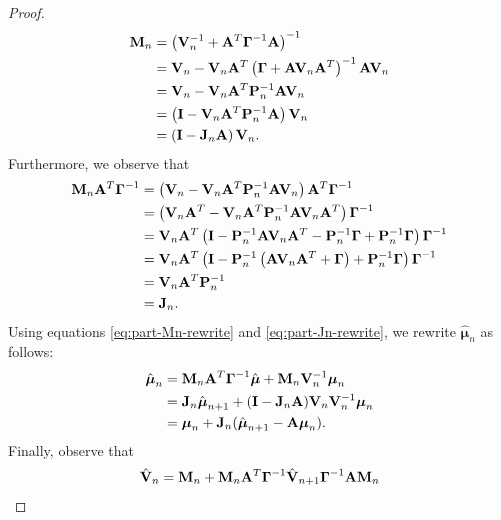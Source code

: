 \documentclass[11pt]{article}
\numberwithin{equation}{section}
\begin{document}
\begin{proof}
	\begin{align}
		{\bf M}_n 
			&= \left({\bf V}_n^{-1} + {\bf A}^T \boldsymbol\Gamma^{-1} {\bf A}\right)^{-1}\\
			&= {\bf V}_n - {\bf V}_n{\bf A}^T\left(\boldsymbol\Gamma + {\bf A}{\bf V}_n {\bf A}^T\right)^{-1}{\bf A}{\bf V}_n\\
			&= {\bf V}_n - {\bf V}_n{\bf A}^T{\bf P}_n^{-1}{\bf A}{\bf V}_n\\
			&= \left({\bf I} - {\bf V}_n{\bf A}^T{\bf P}_n^{-1}{\bf A}\right){\bf V}_n\\
			&= \left({\bf I} - {\bf J}_n{\bf A}\right){\bf V}_n. \label{eq:part-Mn-rewrite}
	\end{align}
	Furthermore, we observe that
	\begin{align}
		{\bf M}_n {\bf A}^T \boldsymbol{\Gamma}^{-1}
		&= \left({\bf V}_n - {\bf V}_n{\bf A}^T{\bf P}_n^{-1}{\bf A}{\bf V}_n\right){\bf A}^T\boldsymbol\Gamma^{-1}\\
		&= \left({\bf V}_n{\bf A}^T - {\bf V}_n{\bf A}^T{\bf P}_n^{-1}{\bf A}{\bf V}_n{\bf A}^T\right)\boldsymbol\Gamma^{-1}\\
		&= {\bf V}_n{\bf A}^T\left({\bf I} - {\bf P}_n^{-1}{\bf A}{\bf V}_n{\bf A}^T - {\bf P}_n^{-1}\boldsymbol{\Gamma} + {\bf P}_n^{-1}\boldsymbol{\Gamma}\right)\boldsymbol\Gamma^{-1}\\
		&= {\bf V}_n{\bf A}^T\left({\bf I} - {\bf P}_n^{-1}\left({\bf A}{\bf V}_n{\bf A}^T + \boldsymbol\Gamma\right) + {\bf P}_n^{-1}\boldsymbol{\Gamma}\right)\boldsymbol\Gamma^{-1}\\
		&= {\bf V}_n{\bf A}^T {\bf P}_n^{-1}\\
		&= {\bf J}_n. \label{eq:part-Jn-rewrite}
	\end{align}
	Using equations \eqref{eq:part-Mn-rewrite} and \eqref{eq:part-Jn-rewrite}, we rewrite $\hat{\boldsymbol{\mu}}_n$ as follows:
	\begin{align}
		\hat{\boldsymbol{\mu}}_n 
		&= {\bf M}_n {\bf A}^T \boldsymbol\Gamma ^{-1} \hat{\boldsymbol{\mu}} + {\bf M}_n {\bf V}_n^{-1} \boldsymbol\mu_n\\
		&= {\bf J}_n \hat{\boldsymbol{\mu}}_{n+1} + ({\bf I} - {\bf J}_n {\bf A}){\bf V}_n{\bf V}_n^{-1}\boldsymbol{\mu}_n\\
		&= \boldsymbol{\mu}_n + {\bf J}_n(\hat{\boldsymbol{\mu}}_{n+1} - {\bf A}\boldsymbol\mu_n).
	\end{align}
	Finally, observe that 
	\begin{align}
		\hat{{\bf V}}_n
		&= {\bf M}_n + {\bf M}_n {\bf A}^T \boldsymbol{\Gamma}^{-1} \hat{\bf V}_{n+1}\boldsymbol\Gamma^{-1}{\bf A}{\bf M}_n\\

\end{align}
\end{proof}
\end{document}
